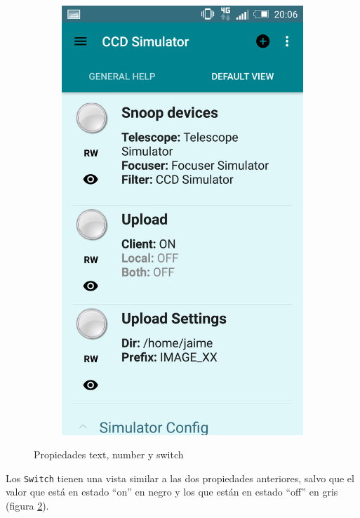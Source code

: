 \begin{figure}
\begin{subfigure}[]{0.4\textwidth}
        \includegraphics[width=\textwidth]{../images/captura13.png}
        \caption{}
        \label{fig:captura11}
    \end{subfigure}
    \caption{Propiedades text, number y switch}\label{fig:capturas6}
\end{figure}

Los \texttt{Switch} tienen una vista similar a las dos propiedades anteriores, salvo que el valor que está en estado ``on'' en negro y los que están en estado ``off'' en gris (figura \ref{fig:capturas6}).


